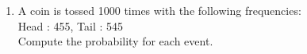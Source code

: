 \renewcommand{\theequation}{\theenumi}
\begin{enumerate}[label=\arabic*.,ref=\thesubsection.\theenumi]
\item A coin is tossed 1000 times with the following frequencies:\\
Head : 455, Tail : 545\\
Compute the probability for each event.
\end{enumerate}